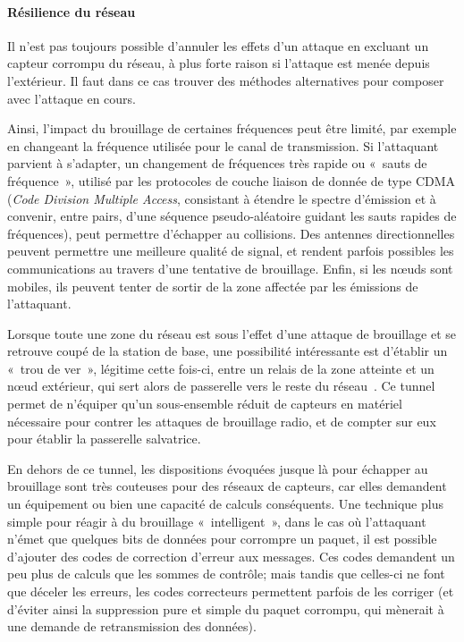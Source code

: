         \paragraph{Résilience du réseau}
Il n'est pas toujours possible d'annuler les effets d'un attaque en excluant un capteur corrompu du réseau, à plus forte raison si l'attaque est menée depuis l'extérieur.
Il faut dans ce cas trouver des méthodes alternatives pour composer avec l'attaque en cours.

Ainsi, l'impact du brouillage de certaines fréquences peut être limité, par exemple en changeant la fréquence utilisée pour le canal de transmission.
Si l'attaquant parvient à s'adapter, un changement de fréquences très rapide ou « sauts de fréquence », utilisé par les protocoles de couche liaison de donnée de type CDMA (\textit{Code Division Multiple Access}, consistant à étendre le spectre d'émission et à convenir, entre pairs, d'une séquence pseudo-aléatoire guidant les sauts rapides de fréquences), peut permettre d'échapper au collisions.
Des antennes directionnelles peuvent permettre une meilleure qualité de signal, et rendent parfois possibles les communications au travers d'une tentative de brouillage.
Enfin, si les nœuds sont mobiles, ils peuvent tenter de sortir de la zone affectée par les émissions de l'attaquant.

Lorsque toute une zone du réseau est sous l'effet d'une attaque de brouillage et se retrouve coupé de la station de base, une possibilité intéressante est d'établir un « trou de ver », légitime cette fois-ci, entre un relais de la zone atteinte et un nœud extérieur, qui sert alors de passerelle vers le reste du réseau~\cite{CCH07}.
Ce tunnel permet de n'équiper qu'un sous-ensemble réduit de capteurs en matériel nécessaire pour contrer les attaques de brouillage radio, et de compter sur eux pour établir la passerelle salvatrice.

En dehors de ce tunnel, les dispositions évoquées jusque là pour échapper au brouillage sont très couteuses pour des réseaux de capteurs, car elles demandent un équipement ou bien une capacité de calculs conséquents.
Une technique plus simple pour réagir à du brouillage « intelligent », dans le cas où l'attaquant n'émet que quelques bits de données pour corrompre un paquet, il est possible d'ajouter des codes de correction d'erreur aux messages.
Ces codes demandent un peu plus de calculs que les sommes de contrôle; mais tandis que celles-ci ne font que déceler les erreurs, les codes correcteurs permettent parfois de les corriger (et d'éviter ainsi la suppression pure et simple du paquet corrompu, qui mènerait à une demande de retransmission des données).

